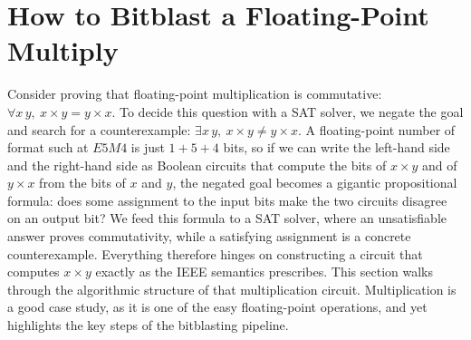 \section{How to Bitblast a Floating-Point Multiply}
\label{sec:fp:overview}

Consider proving that floating-point multiplication is commutative:
$\forall x\, y,\ x \times y = y \times x$.
To decide this question with a SAT solver, we negate the goal and search for a counterexample:
$\exists x\, y,\ x \times y \neq y \times x$.
A floating-point number of format such at $E5M4$ is just $1 + 5 + 4$ bits,
so if we can write the left-hand side and the right-hand side as Boolean circuits
that compute the bits of $x \times y$ and of $y \times x$ from the bits of $x$ and $y$,
the negated goal becomes a gigantic propositional formula:
does some assignment to the input bits make the two circuits disagree on an output bit?
We feed this formula to a SAT solver, where
an unsatisfiable answer proves commutativity,
while a satisfying assignment is a concrete counterexample.
Everything therefore hinges on constructing a circuit that computes $x \times y$
exactly as the IEEE semantics prescribes.
This section walks through the algorithmic structure of that multiplication circuit.
Multiplication is a good case study, as it is one of the easy floating-point operations,
and yet highlights the key steps of the bitblasting pipeline.

